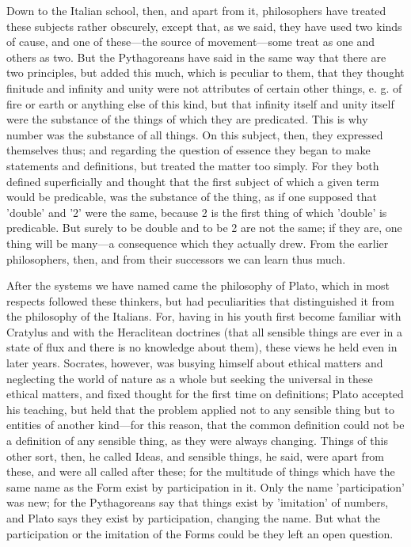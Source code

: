 Down to the Italian school, then, and apart from it, philosophers have treated these subjects rather obscurely, except that, as we said, they have used two kinds of cause, and one of these—the source of movement—some treat as one and others as two. But the Pythagoreans have said in the same way that there are two principles, but added this much, which is peculiar to them, that they thought finitude and infinity and unity were not attributes of certain other things, e. g. of fire or earth or anything else of this kind, but that infinity itself and unity itself were the substance of the things of which they are predicated. This is why number was the substance of all things. On this subject, then, they expressed themselves thus; and regarding the question of essence they began to make statements and definitions, but treated the matter too simply. For they both defined superficially and thought that the first subject of which a given term would be predicable, was the substance of the thing, as if one supposed that 'double' and '2' were the same, because 2 is the first thing of which 'double' is predicable. But surely to be double and to be 2 are not the same; if they are, one thing will be many—a consequence which they actually drew. From the earlier philosophers, then, and from their successors we can learn thus much.


After the systems we have named came the philosophy of Plato, which in most respects followed these thinkers, but had peculiarities that distinguished it from the philosophy of the Italians. For, having in his youth first become familiar with Cratylus and with the Heraclitean doctrines (that all sensible things are ever in a state of flux and there is no knowledge about them), these views he held even in later years. Socrates, however, was busying himself about ethical matters and neglecting the world of nature as a whole but seeking the universal in these ethical matters, and fixed thought for the first time on definitions; Plato accepted his teaching, but held that the problem applied not to any sensible thing but to entities of another kind—for this reason, that the common definition could not be a definition of any sensible thing, as they were always changing. Things of this other sort, then, he called Ideas, and sensible things, he said, were apart from these, and were all called after these; for the multitude of things which have the same name as the Form exist by participation in it. Only the name 'participation' was new; for the Pythagoreans say that things exist by 'imitation' of numbers, and Plato says they exist by participation, changing the name. But what the participation or the imitation of the Forms could be they left an open question.

